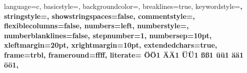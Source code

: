 {
  language=c,	%
  basicstyle=\scriptsize\ttfamily,	%
  backgroundcolor=\color{white},		%
  breaklines=true,	%
  keywordstyle=\bfseries\ttfamily\color{blue},	%
  stringstyle=\ttfamily\color{Peach},			%
  showstringspaces=false,	%
  commentstyle=\color{ForestGreen}\ttfamily,	%
  flexiblecolumns=false,	%
  numbers=left,		%
  numberstyle=\tiny,	%
  numberblanklines=false,		%
  stepnumber=1,		%
  numbersep=10pt,		%
  xleftmargin=20pt,	%
  xrightmargin=10pt,	%
  extendedchars=true,	%
  frame=trbl,			%
  frameround=ffff,	%
  literate=		%
   {Ö}{{\"O}}1 
   {Ä}{{\"A}}1 
   {Ü}{{\"U}}1 
   {ß}{{\ss}}1 
   {ü}{{\"u}}1 
   {ä}{{\"a}}1 
   {ö}{{\"o}}1,
}


